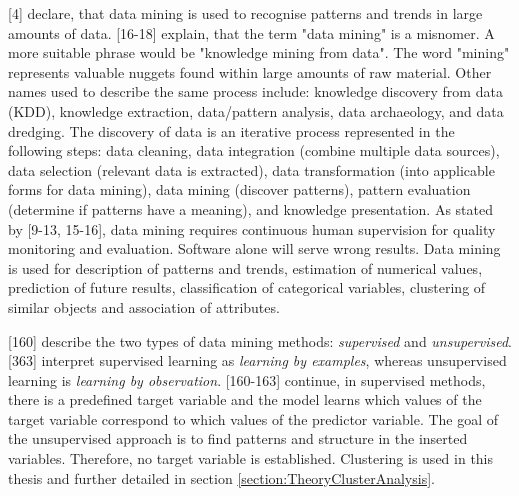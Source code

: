 \textcite{DataMiningAndPredictiveAnalytics}[4] declare, that data mining is used to recognise patterns and trends in large amounts of data. \textcite{han2011data}[16-18] explain, that the term "data mining" is a misnomer. A more suitable phrase would be "knowledge mining from data". The word "mining" represents valuable nuggets found within large amounts of raw material. Other names used to describe the same process include: knowledge discovery from data (KDD), knowledge extraction, data/pattern analysis, data archaeology, and data dredging. The discovery of data is an iterative process represented in the following steps: data cleaning, data integration (combine multiple data sources), data selection (relevant data is extracted), data transformation (into applicable forms for data mining), data mining (discover patterns), pattern evaluation (determine if patterns have a meaning), and knowledge presentation. 
As stated by \textcite{DataMiningAndPredictiveAnalytics}[9-13, 15-16], data mining requires continuous human supervision for quality monitoring and evaluation. Software alone will serve wrong results. Data mining is used for description of patterns and trends, estimation of numerical values, prediction of future results, classification of categorical variables, clustering of similar objects and association of attributes. 

\textcite{DataMiningAndPredictiveAnalytics}[160] describe the two types of data mining methods: \textit{supervised} and \textit{unsupervised}. \textcite{han2011data}[363] interpret supervised learning as \textit{learning by examples}, whereas unsupervised learning is \textit{learning by observation}. \textcite{DataMiningAndPredictiveAnalytics}[160-163] continue, in supervised methods, there is a predefined target variable and the model learns which values of the target variable correspond to which values of the predictor variable. The goal of the unsupervised approach is to find patterns and structure in the inserted variables. Therefore, no target variable is established. Clustering is used in this thesis and further detailed in section \ref{section:TheoryClusterAnalysis}.

